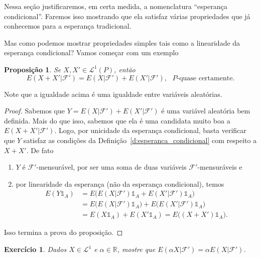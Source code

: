 \documentclass[reqno]{article}
\newcommand*\1{\mathds{1}}
\newtheorem{proposition}[theorem]{Proposição}
\newtheorem{exercise}[example]{Exercício}
\begin{document}
Nessa seção justificaremos, em certa medida, a nomenclatura ``esperança condicional''.
Faremos isso mostrando que ela satisfaz várias propriedades que já conhecemos para a esperança tradicional.

Mas como podemos mostrar propriedades simples tais como a linearidade da esperança condicional?
Vamos começar com um exemplo

\begin{proposition}
  Se $X, X' \in \mathcal{L}^1(P)$, então
  \begin{equation}
    E(X + X'|\mathcal{F}') = E(X|\mathcal{F}') + E(X'|\mathcal{F}'), \text{ $P$-quase certamente.}
  \end{equation}
\end{proposition}

Note que a igualdade acima é uma igualdade entre variáveis aleatórias.

\begin{proof}
  Sabemos que $Y = E(X|\mathcal{F}') + E(X'|\mathcal{F}')$ é uma variável aleatória bem definida.
  Mais do que isso, sabemos que ela é uma candidata muito boa a $E(X + X'|\mathcal{F}')$.
  Logo, por unicidade da esperança condicional, basta verificar que $Y$ satisfaz as condições da Definição~\ref{d:esperanca_condicional} com respeito a $X + X'$.
  De fato
  \begin{enumerate}[\quad a)]
  \item $Y$ é $\mathcal{F}'$-mensurável, por ser uma soma de duas variáveis $\mathcal{F}'$-mensuráveis e
  \item por linearidade da esperança (não da esperança condicional), temos
    \begin{equation}
      \begin{split}
        E(Y \1_A) & = E\big( E(X|\mathcal{F}')\1_A + E(X'|\mathcal{F}')\1_A \big)\\
        & = E\big( E(X|\mathcal{F}')\1_A\big) + E\big(E(X'|\mathcal{F}')\1_A \big)\\
        & = E(X \1_A) + E(X' \1_A) = E\big( (X + X') \1_A \big).
      \end{split}
    \end{equation}
  \end{enumerate}
  Isso termina a prova do proposição.
\end{proof}

\begin{exercise}
  Dados $X \in \mathcal{L}^1$ e $\alpha \in \mathbb{R}$, mostre que $E(\alpha X|\mathcal{F}') = \alpha E(X|\mathcal{F}')$.
\end{exercise}
\end{document}
